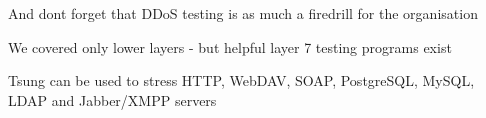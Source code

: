 \documentclass[Screen16to9,17pt]{foils}
\begin{document}
\vskip 3cm
\centerline{And dont forget that DDoS testing is as much a firedrill for the organisation}



\begin{list1}
\item We covered only lower layers - but helpful layer 7 testing programs exist
\item Tsung can be used to stress HTTP, WebDAV, SOAP, PostgreSQL, MySQL, LDAP and Jabber/XMPP servers 
\end{list1}


\slidenext
\end{document}
